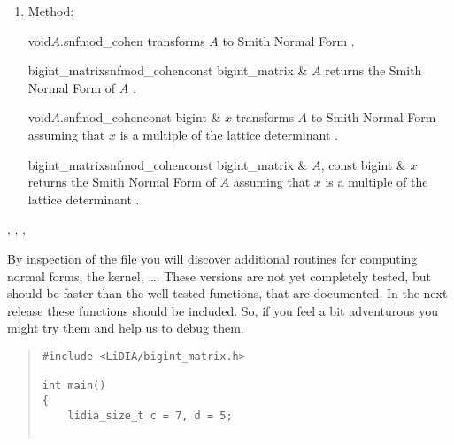 {\begin{enumerate}
\item Method:

  \begin{fcode}{void}{$A$.snfmod_cohen}{}
    transforms $A$ to Smith Normal Form \cite{Cohen:1995}.
  \end{fcode}

  \begin{fcode}{bigint_matrix}{snfmod_cohen}{const bigint_matrix & $A$}
    returns the Smith Normal Form of $A$ \cite{Cohen:1995}.
  \end{fcode}

  \begin{fcode}{void}{$A$.snfmod_cohen}{const bigint & $x$}
    transforms $A$ to Smith Normal Form assuming that $x$ is a multiple of the lattice
    determinant \cite{Cohen:1995}.
  \end{fcode}

  \begin{fcode}{bigint_matrix}{snfmod_cohen}{const bigint_matrix & $A$, const bigint & $x$}
    returns the Smith Normal Form of $A$ assuming that $x$ is a multiple of the lattice
    determinant \cite{Cohen:1995}.
  \end{fcode}
\end{enumerate}



\SEEALSO

, ,
, 



\NOTES

By inspection of the file  you will discover additional routines for
computing normal forms, the kernel, \dots.  These versions are not yet completely tested, but
should be faster than the well tested functions, that are documented.  In the next release these
functions should be included.  So, if you feel a bit adventurous you might try them and help us
to debug them.



\EXAMPLES

\begin{quote}
\begin{verbatim}
#include <LiDIA/bigint_matrix.h>

int main()
{
    lidia_size_t c = 7, d = 5;


\end{verbatim}
\end{quote}}

